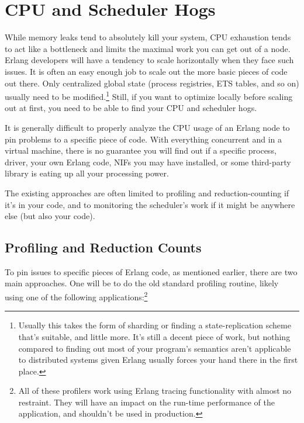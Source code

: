 \documentclass[11pt, oneside]{book}   	%
\begin{document}

\chapter{CPU and Scheduler Hogs}
\label{chap:cpu-hogs}

While memory leaks tend to absolutely kill your system, CPU exhaustion tends to act like a bottleneck and limits the maximal work you can get out of a node. Erlang developers will have a tendency to scale horizontally when they face such issues. It is often an easy enough job to scale out the more basic pieces of code out there. Only centralized global state (process registries, ETS tables, and so on) usually need to be modified.\footnote{Usually this takes the form of sharding or finding a state-replication scheme that's suitable, and little more. It's still a decent piece of work, but nothing compared to finding out most of your program's semantics aren't applicable to distributed systems given Erlang usually forces your hand there in the first place.} Still, if you want to optimize locally before scaling out at first, you need to be able to find your CPU and scheduler hogs.

It is generally difficult to properly analyze the CPU usage of an Erlang node to pin problems to a specific piece of code. With everything concurrent and in a virtual machine, there is no guarantee you will find out if a specific process, driver, your own Erlang code, NIFs you may have installed, or some third-party library is eating up all your processing power.

The existing approaches are often limited to profiling and reduction-counting if it's in your code, and to monitoring the scheduler's work if it might be anywhere else (but also your code).

\section{Profiling and Reduction Counts}
\label{sec:cpu-profiling}

To pin issues to specific pieces of Erlang code, as mentioned earlier, there are two main approaches. One will be to do the old standard profiling routine, likely using one of the following applications:\footnote{All of these profilers work using Erlang tracing functionality with almost no restraint. They will have an impact on the run-time performance of the application, and shouldn't be used in production.}
\end{document}
